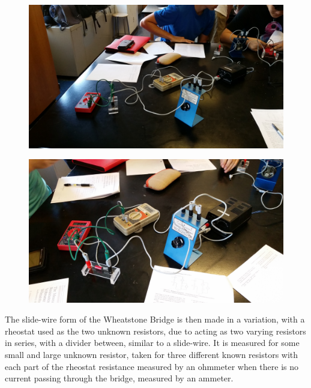 \documentclass[11pt, titlepage]{article}
\begin{document}
\begin{figure}[h]
\centering
\hspace*{0cm}
\includegraphics[scale=0.12, angle=90]{lab11.jpg}
\vspace*{0cm}
\end{figure}

\begin{figure}[h]
\centering
\hspace*{0cm}
\includegraphics[scale=0.12, angle=270]{lab12.jpg}
\vspace*{0cm}
\end{figure}

The slide-wire form of the Wheatstone Bridge is then made in a variation, with a rheostat used as the two unknown resistors, due to acting as two varying resistors in series, with a divider between, similar to a slide-wire. It is measured for some small and large unknown resistor, taken for three different known resistors with each part of the rheostat resistance measured by an ohmmeter when there is no current passing through the bridge, measured by an ammeter.
\end{document}
